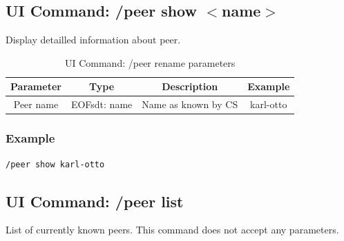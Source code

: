 \subsection{UI Command: /peer show $<$name$>$}
Display detailled information about peer.
%
\begin{longtable}{|c|c|c|c|}
\caption{UI Command: /peer rename parameters}\\
\hline
\textbf{Parameter} & \textbf{Type} & \textbf{Description} & \textbf{Example}\\
\hline
Peer name & EOFsdt: name & Name as known by CS & karl-otto\\
\hline
\end{longtable}

\subsubsection{Example}
\begin{verbatim}
/peer show karl-otto
\end{verbatim}
\subsection{UI Command: /peer list}
List of currently known peers. This command does not accept any parameters.

